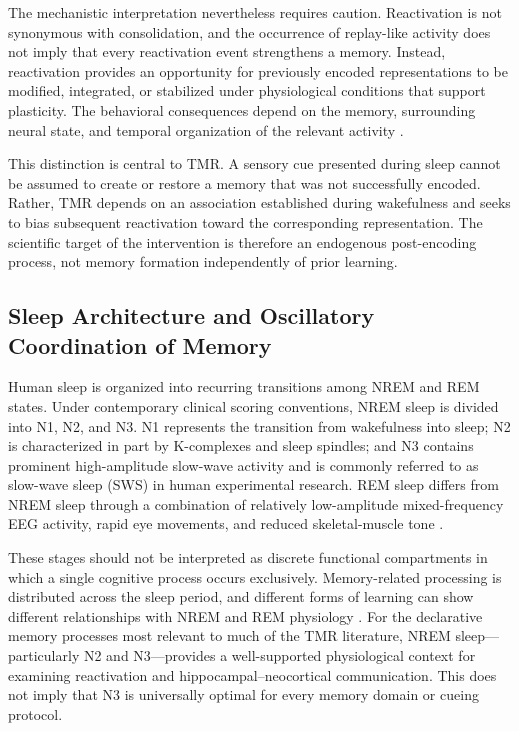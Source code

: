 The mechanistic interpretation nevertheless requires caution. Reactivation is
not synonymous with consolidation, and the occurrence of replay-like activity
does not imply that every reactivation event strengthens a memory. Instead,
reactivation provides an opportunity for previously encoded representations to
be modified, integrated, or stabilized under physiological conditions that
support plasticity. The behavioral consequences depend on the memory,
surrounding neural state, and temporal organization of the relevant activity
\citep{dudai2015consolidation,klinzing2019mechanisms}.

This distinction is central to TMR. A sensory cue presented during sleep cannot
be assumed to create or restore a memory that was not successfully encoded.
Rather, TMR depends on an association established during wakefulness and seeks
to bias subsequent reactivation toward the corresponding representation. The
scientific target of the intervention is therefore an endogenous post-encoding
process, not memory formation independently of prior learning.


\subsection{Sleep Architecture and Oscillatory Coordination of Memory}

Human sleep is organized into recurring transitions among NREM and REM states.
Under contemporary clinical scoring conventions, NREM sleep is divided into
N1, N2, and N3. N1 represents the transition from wakefulness into sleep; N2 is
characterized in part by K-complexes and sleep spindles; and N3 contains
prominent high-amplitude slow-wave activity and is commonly referred to as
slow-wave sleep (SWS) in human experimental research. REM sleep differs from
NREM sleep through a combination of relatively low-amplitude mixed-frequency
EEG activity, rapid eye movements, and reduced skeletal-muscle tone
\citep{silber2007scoring}.

These stages should not be interpreted as discrete functional compartments in
which a single cognitive process occurs exclusively. Memory-related processing
is distributed across the sleep period, and different forms of learning can
show different relationships with NREM and REM physiology
\citep{diekelmann2010memory,rasch2013sleep}. For the declarative memory
processes most relevant to much of the TMR literature, NREM sleep---particularly
N2 and N3---provides a well-supported physiological context for examining
reactivation and hippocampal--neocortical communication. This does not imply
that N3 is universally optimal for every memory domain or cueing protocol.

